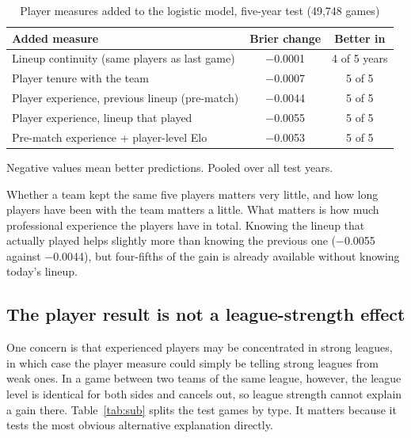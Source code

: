 \documentclass[12pt,a4paper]{article}
\begin{document}
\begin{table}[H]
\centering\small
\begin{threeparttable}
\caption{Player measures added to the logistic model, five-year test (49,748 games)}\label{tab:ablation}
\begin{tabular}{@{}lcc@{}}
\toprule
Added measure & Brier change & Better in \\
\midrule
Lineup continuity (same players as last game) & $-$0.0001 & 4 of 5 years \\
Player tenure with the team & $-$0.0007 & 5 of 5 \\
Player experience, previous lineup (pre-match) & $-$0.0044 & 5 of 5 \\
Player experience, lineup that played & $-$0.0055 & 5 of 5 \\
Pre-match experience + player-level Elo & $-$0.0053 & 5 of 5 \\
\bottomrule
\end{tabular}
\begin{tablenotes}\footnotesize
\item Negative values mean better predictions. Pooled over all test years.
\end{tablenotes}
\end{threeparttable}
\end{table}

Whether a team kept the same five players matters very little, and how long players have been with the team matters a little. What matters is how much professional experience the players have in total. Knowing the lineup that actually played helps slightly more than knowing the previous one ($-$0.0055 against $-$0.0044), but four-fifths of the gain is already available without knowing today's lineup.

\subsection{The player result is not a league-strength effect}

One concern is that experienced players may be concentrated in strong leagues, in which case the player measure could simply be telling strong leagues from weak ones. In a game between two teams of the same league, however, the league level is identical for both sides and cancels out, so league strength cannot explain a gain there. Table~\ref{tab:sub} splits the test games by type. It matters because it tests the most obvious alternative explanation directly.
\end{document}
